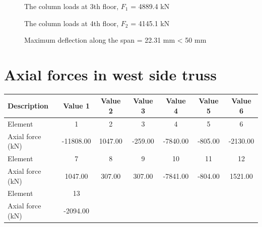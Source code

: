 \documentclass[
  letterpaper,
  DIV=11,
  numbers=noendperiod]{scrartcl}
\def\arraystretch{1.4}
\begin{document}
\begin{description}
    \item[]The column loads at 3th floor, $F_1$ = 4889.4 kN
    \item[]The column loads at 4th floor, $F_2$ = 4145.1 kN
    \item[]Maximum deflection along the span = 22.31 mm < 50 mm
\end{description}

\newpage{}

\section{}\label{section-10}

\section{}\label{section-11}

\section{}\label{section-12}

\section{}\label{section-13}

\section{}\label{section-14}

\section{}\label{section-15}

\section{}\label{section-16}

\section{Axial forces in west side
truss}\label{axial-forces-in-west-side-truss}

\normalfont
\renewcommand{\arraystretch}{1.2}
\setlength{\tabcolsep}{11pt}
\begin{tabular}{|l|c|c|c|c|c|c|}
\hline
Description & Value 1 & Value 2 & Value 3 & Value 4 & Value 5 & Value 6 \\
\hline
Element & 1 & 2 & 3 & 4 & 5 & 6 \\
Axial force (kN) & -11808.00 & 1047.00 & -259.00 & -7840.00 & -805.00 & -2130.00 \\
\hline
Element & 7 & 8 & 9 & 10 & 11 & 12 \\
Axial force (kN) & 1047.00 & 307.00 & 307.00 & -7841.00 & -804.00 & 1521.00 \\
\hline
Element & 13 &  &  &  &  &  \\
Axial force (kN) & -2094.00 &  &  &  &  &  \\
\hline
\end{tabular}
\end{document}

